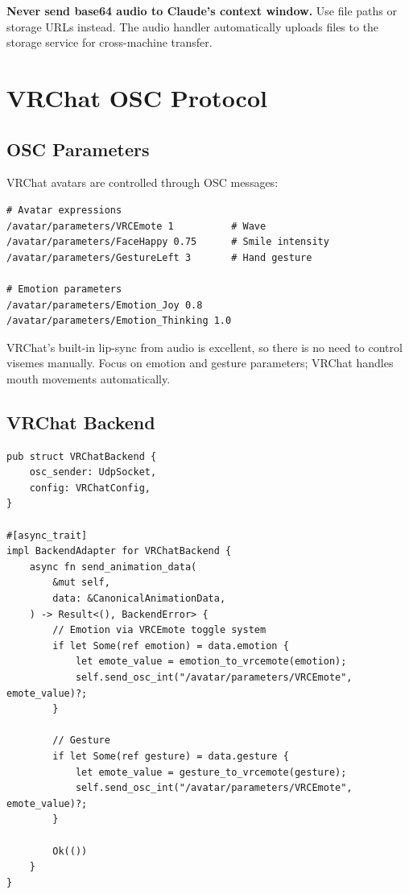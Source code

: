 \documentclass[11pt,letterpaper]{article}
\begin{document}
\begin{warnbox}
\textbf{Never send base64 audio to Claude's context window.} Use file paths or storage URLs instead. The audio handler automatically uploads files to the storage service for cross-machine transfer.
\end{warnbox}

\section{VRChat OSC Protocol}

\subsection{OSC Parameters}

VRChat avatars are controlled through OSC messages:

\begin{lstlisting}[language={}, caption=OSC Message Examples]
# Avatar expressions
/avatar/parameters/VRCEmote 1          # Wave
/avatar/parameters/FaceHappy 0.75      # Smile intensity
/avatar/parameters/GestureLeft 3       # Hand gesture

# Emotion parameters
/avatar/parameters/Emotion_Joy 0.8
/avatar/parameters/Emotion_Thinking 1.0
\end{lstlisting}

\begin{tipbox}
VRChat's built-in lip-sync from audio is excellent, so there is no need to control visemes manually. Focus on emotion and gesture parameters; VRChat handles mouth movements automatically.
\end{tipbox}

\subsection{VRChat Backend}

\begin{lstlisting}[caption=VRChat Remote Backend]
pub struct VRChatBackend {
    osc_sender: UdpSocket,
    config: VRChatConfig,
}

#[async_trait]
impl BackendAdapter for VRChatBackend {
    async fn send_animation_data(
        &mut self,
        data: &CanonicalAnimationData,
    ) -> Result<(), BackendError> {
        // Emotion via VRCEmote toggle system
        if let Some(ref emotion) = data.emotion {
            let emote_value = emotion_to_vrcemote(emotion);
            self.send_osc_int("/avatar/parameters/VRCEmote", emote_value)?;
        }

        // Gesture
        if let Some(ref gesture) = data.gesture {
            let emote_value = gesture_to_vrcemote(gesture);
            self.send_osc_int("/avatar/parameters/VRCEmote", emote_value)?;
        }

        Ok(())
    }
}
\end{lstlisting}
\end{document}
